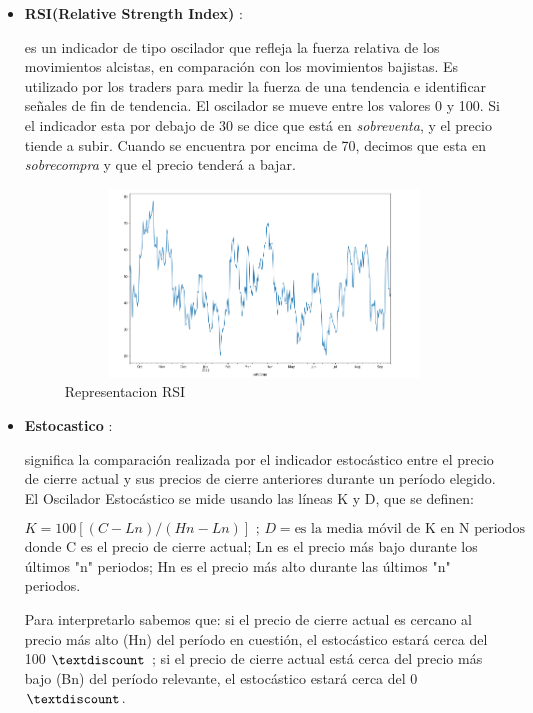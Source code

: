 \documentclass[11pt]{article} %
\begin{document}
\begin{itemize}
	
	\item \textbf{RSI(Relative Strength Index) }:	

es un indicador de tipo oscilador que refleja la fuerza relativa de los movimientos alcistas, en comparación con los movimientos bajistas. Es utilizado por los traders para medir la fuerza de una tendencia e identificar señales de fin de tendencia. El oscilador se mueve entre los valores 0 y 100. Si el indicador esta por debajo de 30 se dice que está en \textit{sobreventa}, y el precio tiende a subir. Cuando se encuentra por encima de 70, decimos que esta en \textit{sobrecompra} y que el precio tenderá a bajar.


\begin{center}
	\begin{figure}[htb]
		\centering
		\includegraphics[width=12cm, height=5cm]{RSI.png}
		\caption{Representacion RSI}
	\end{figure}
\end{center}

\newpage

	\item \textbf{Estocastico } \cite{estocastico}:
	
significa la comparación realizada por el indicador estocástico entre el precio de cierre actual y sus precios de cierre anteriores durante un período elegido. El Oscilador Estocástico se mide usando las líneas K y D, que se definen:

$$
K = 100 [(C -Ln)/(Hn-Ln)] \text{ ;  }D = \text{es la media móvil de K en N periodos}
$$	
donde  C es el precio de cierre actual; Ln es el precio más bajo durante los últimos "n" periodos; Hn es el precio más alto durante las últimos "n" periodos.	

Para interpretarlo sabemos que: si el precio de cierre actual es cercano al precio más alto (Hn) del período en cuestión, el estocástico estará cerca del 100 $\textdiscount$ ; si el precio de cierre actual está cerca del precio más bajo (Bn) del período relevante, el estocástico estará cerca del 0 $\textdiscount$.


\end{itemize}
\end{document}
